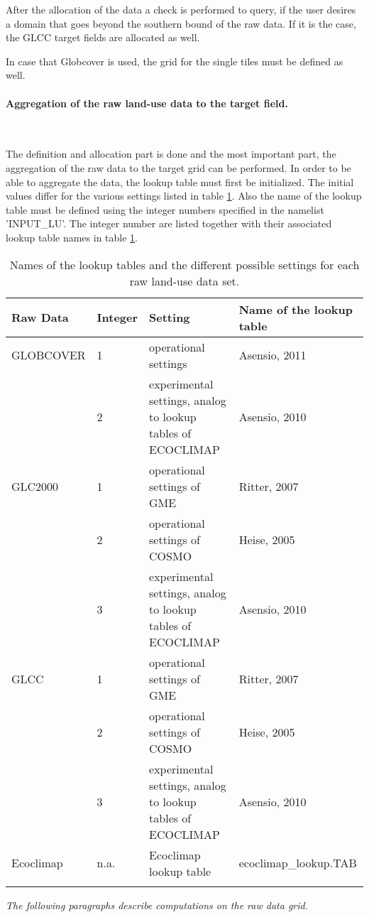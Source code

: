 \documentclass[a4paper,10pt,DIV14,BCOR1cm,titlepage,twoside]{scrartcl}
\providecommand{\tabularnewline}{\\}
\begin{document}
\noindent After the allocation of the data a check is performed to query, if the user desires a domain that goes beyond the southern bound of the raw data. If it is the case, the GLCC target fields are allocated as well.  \par\medskip\noindent
In case that Globcover is used, the grid for the single tiles must be defined as well.\par\medskip\noindent
\paragraph{Aggregation of the raw land-use data to the target field.}\ \par\medskip\noindent
The definition and allocation part is done and the most important part, the aggregation of the raw data to the target grid can be performed. In order to be able to aggregate the data, the lookup table must first be initialized. The initial values differ for the various settings listed in table \ref{tab:look_up_table}. Also the name of the lookup table must be defined using the integer numbers specified in the namelist 'INPUT\_LU'. The integer number are listed together with their associated lookup table names in table \ref{tab:look_up_table}.
\begin{longtable}{p{2.25cm}p{1.25cm}p{6.5cm}p{4.5cm}}
\textbf{Raw Data} & \textbf{Integer} & \textbf{Setting} & \textbf{Name of the lookup table}\tabularnewline
\hline
\endhead
\hline
GLOBCOVER & 1 & operational settings & Asensio, 2011 \tabularnewline\hline
          & 2 & experimental settings, analog to lookup tables of ECOCLIMAP& Asensio, 2010 \tabularnewline\hline
GLC2000 & 1 & operational settings of GME & Ritter, 2007 \tabularnewline\hline
        & 2 & operational settings of COSMO & Heise, 2005 \tabularnewline\hline
        & 3 & experimental settings, analog to lookup tables of ECOCLIMAP & Asensio, 2010 \tabularnewline\hline
GLCC & 1 & operational settings of GME & Ritter, 2007 \tabularnewline\hline
     & 2 & operational settings of COSMO & Heise, 2005 \tabularnewline\hline
     & 3 & experimental settings, analog to lookup tables of ECOCLIMAP & Asensio, 2010 \tabularnewline\hline
Ecoclimap & n.a. & Ecoclimap lookup table & ecoclimap\_lookup.TAB \tabularnewline
\bottomrule
\caption{Names of the lookup tables and the different possible settings for each raw land-use data set.}
\label{tab:look_up_table}
\end{longtable}
\par\medskip\noindent
\textit{The following paragraphs describe computations on the raw data grid.} \par\medskip\noindent
\end{document}
